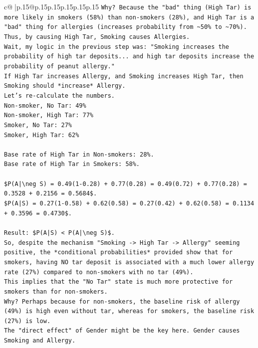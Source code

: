 \documentclass{article}
\begin{document}
{\begin{supertabular}{c@{$\;$}|p{.15\linewidth}@{}p{.15\linewidth}p{.15\linewidth}p{.15\linewidth}p{.15\linewidth}p{.15\linewidth}}
{{{\texttt{Why? Because the "bad" thing (High Tar) is more likely in smokers (58\%) than non{-}smokers (28\%), and High Tar is a "bad" thing for allergies (increases probability from \textasciitilde{}50\% to \textasciitilde{}70\%). Thus, by causing High Tar, Smoking causes Allergies.} \\
\texttt{Wait, my logic in the previous step was: "Smoking increases the probability of high tar deposits... and high tar deposits increase the probability of peanut allergy."} \\
\texttt{If High Tar increases Allergy, and Smoking increases High Tar, then Smoking should *increase* Allergy.} \\
\texttt{Let's re{-}calculate the numbers.} \\
\texttt{Non{-}smoker, No Tar: 49\%} \\
\texttt{Non{-}smoker, High Tar: 77\%} \\
\texttt{Smoker, No Tar: 27\%} \\
\texttt{Smoker, High Tar: 62\%} \\
\\ 
\texttt{Base rate of High Tar in Non{-}smokers: 28\%.} \\
\texttt{Base rate of High Tar in Smokers: 58\%.} \\
\\ 
\texttt{\$P(A|\textbackslash{}neg S) = 0.49(1{-}0.28) + 0.77(0.28) = 0.49(0.72) + 0.77(0.28) = 0.3528 + 0.2156 = 0.5684\$.} \\
\texttt{\$P(A|S) = 0.27(1{-}0.58) + 0.62(0.58) = 0.27(0.42) + 0.62(0.58) = 0.1134 + 0.3596 = 0.4730\$.} \\
\\ 
\texttt{Result: \$P(A|S) < P(A|\textbackslash{}neg S)\$.} \\
\texttt{So, despite the mechanism "Smoking {-}> High Tar {-}> Allergy" seeming positive, the *conditional probabilities* provided show that for smokers, having NO tar deposit is associated with a much lower allergy rate (27\%) compared to non{-}smokers with no tar (49\%).} \\
\texttt{This implies that the "No Tar" state is much more protective for smokers than for non{-}smokers.} \\
\texttt{Why? Perhaps because for non{-}smokers, the baseline risk of allergy (49\%) is high even without tar, whereas for smokers, the baseline risk (27\%) is low.} \\
\texttt{The "direct effect" of Gender might be the key here. Gender causes Smoking and Allergy.} \\
}}}
\end{supertabular}}
\end{document}
